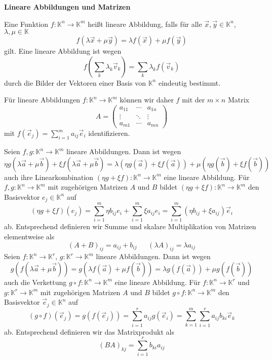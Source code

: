 \documentclass[a4paper,10pt]{article}
\begin{document}
{\bf Lineare Abbildungen und Matrizen}

Eine Funktion $f:\mathbb{K}^n\to \mathbb{K}^m$ heißt lineare
Abbildung, falls für alle $\vec{x},\vec{y}\in \mathbb{K}^n$, $\lambda,\mu\in\mathbb{K}$
\[
f(\lambda \vec{x}+\mu \vec{y})=\lambda f(\vec{x})+\mu f(\vec{y})
\]
gilt.
Eine lineare Abbildung ist wegen
\[
f\left(\sum_k \lambda_k \vec{v}_k\right)=\sum_k \lambda_k f(\vec{v}_k)
\]
durch die Bilder der Vektoren einer Basis von $\mathbb{K}^n$ eindeutig bestimmt.

Für lineare Abbildungen $f:\mathbb{K}^n\to\mathbb{K}^m$ können wir daher
$f$ mit der $m\times n$ Matrix
\[
A = \left(\begin{array}{ccc}a_{11}&\cdots&a_{1n}\\\vdots&\ddots&\vdots\\a_{m1}&\cdots&a_{mn}\end{array}\right)
\]
mit $f(\vec{e}_j)=\sum_{i=1}^m a_{ij}\vec{e}_i$ identifizieren.

Seien $f,g:\mathbb{K}^n\to \mathbb{K}^m$ lineare Abbildungen. Dann ist wegen
\[
\eta g(\lambda \vec{a}+\mu \vec{b}) + \xi f(\lambda \vec{a}+\mu \vec{b})
=\lambda (\eta g(\vec{a})+\xi f(\vec{a}))+\mu (\eta g(\vec{b})+\xi f(\vec{b}))
\]
auch ihre Linearkombination $(\eta g+\xi f):\mathbb{K}^n\to \mathbb{K}^m$ eine lineare Abbildung.
Für $f,g:\mathbb{K}^n\to \mathbb{K}^m$
mit zugehörigen Matrizen $A$ und $B$ bildet $(\eta g+\xi f):\mathbb{K}^n\to \mathbb{K}^m$
den Basisvektor $e_j\in \mathbb{K}^n$ auf
\[
(\eta g+\xi f)(e_j) = \sum_{i=1}^m \eta b_{ij} e_i + \sum_{i=1}^m \xi a_{ij} e_i
= \sum_{i=1}^m (\eta b_{ij}+\xi a_{ij})\vec{e}_i
\]
ab.
Entsprechend definieren wir Summe und skalare Multiplikation
von Matrizen elementweise als
\[
(A+B)_{ij} = a_{ij}+b_{ij}~~~~~~~(\lambda A)_{ij} = \lambda a_{ij}
\]
Seien $f:\mathbb{K}^n\to \mathbb{K}^r$, $g:\mathbb{K}^r\to \mathbb{K}^m$
lineare Abbildungen. Dann ist wegen
\[
g(f(\lambda \vec{a}+\mu\vec{b})) = g(\lambda f(\vec{a})+\mu f(\vec{b}))
=\lambda g(f(\vec{a}))+\mu g(f(\vec{b}))
\]
auch die Verkettung $g\circ f:\mathbb{K}^n\to \mathbb{K}^m$ eine lineare Abbildung.
Für $f:\mathbb{K}^n\to \mathbb{K}^r$ und $g:\mathbb{K}^r\to \mathbb{K}^m$
mit zugehörigen Matrizen $A$ und $B$ bildet
$g\circ f:\mathbb{K}^n\to \mathbb{K}^m$ den Basisvektor
$\vec{e}_j\in \mathbb{K}^n$ auf
\[
(g\circ f)(\vec{e}_j) = g(f(\vec{e}_j)) = \sum_{i=1}^r a_{ij}g(\vec{e}_i)
= \sum_{k=1}^m\sum_{i=1}^r a_{ij}b_{ki}\vec{e}_k
\]
ab.
Entsprechend definieren wir das Matrixprodukt als
\[
(BA)_{kj} = \sum_{i=1}^r b_{ki}a_{ij}
\]
\end{document}
